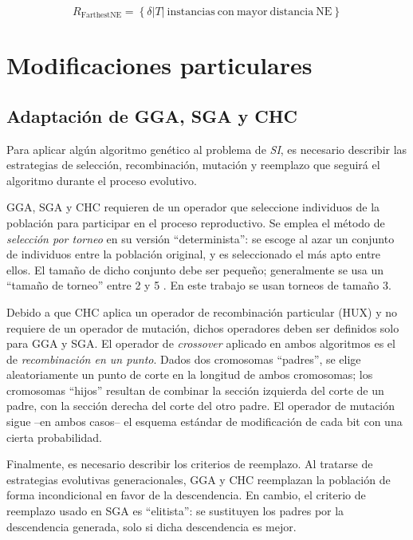 \begin{equation}
R_\mathrm{FarthestNE} = \left\lbrace \delta \vert T \vert\ \mathrm{instancias\ con\ mayor\ distancia\ NE} \right\rbrace
\end{equation}

\section{Modificaciones particulares}

\subsection{Adaptación de GGA, SGA y CHC}

Para aplicar algún algoritmo genético al problema de \emph{SI}, es necesario describir las estrategias de selección, recombinación, mutación y reemplazo que seguirá el algoritmo durante el proceso evolutivo.

GGA, SGA y CHC requieren de un operador que seleccione individuos de la población para participar en el proceso reproductivo. Se emplea el método de \emph{selección por torneo} en su versión ``determinista'': se escoge al azar un conjunto de individuos entre la población original, y es seleccionado el más apto entre ellos. El tamaño de dicho conjunto debe ser pequeño; generalmente se usa un ``tamaño de torneo'' entre 2 y 5 \cite{Miller95geneticalgorithms}. En este trabajo se usan torneos de tamaño 3.

Debido a que CHC aplica un operador de recombinación particular (HUX) y no requiere de un operador de mutación, dichos operadores deben ser definidos solo para GGA y SGA. El operador de \emph{crossover} aplicado en ambos algoritmos es el de \emph{recombinación en un punto}. Dados dos cromosomas ``padres'', se elige aleatoriamente un punto de corte en la longitud de ambos cromosomas; los cromosomas ``hijos'' resultan de combinar la sección izquierda del corte de un padre, con la sección derecha del corte del otro padre. El operador de mutación sigue --en ambos casos-- el esquema estándar de modificación de cada bit con una cierta probabilidad.

Finalmente, es necesario describir los criterios de reemplazo. Al tratarse de estrategias evolutivas generacionales, GGA y CHC reemplazan la población de forma incondicional en favor de la descendencia. En cambio, el criterio de reemplazo usado en SGA es ``elitista'': se sustituyen los padres por la descendencia generada, solo si dicha descendencia es mejor.

